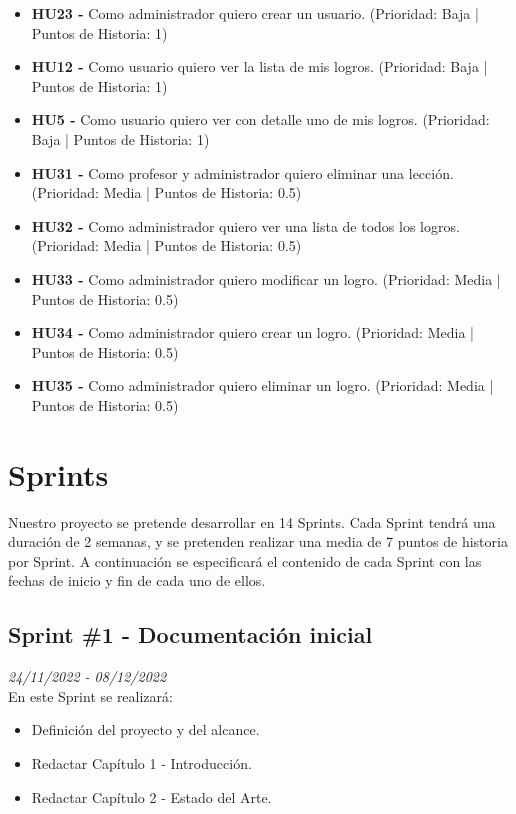 \begin{itemize}
    \item \textbf{HU23 - } Como administrador quiero crear un usuario. (Prioridad: Baja | Puntos de Historia: 1)
    \item \textbf{HU12 - } Como usuario quiero ver la lista de mis logros. (Prioridad: Baja | Puntos de Historia: 1)
    \item \textbf{HU5 - } Como usuario quiero ver con detalle uno de mis logros.  (Prioridad: Baja | Puntos de Historia: 1)
    \item \textbf{HU31 - } Como profesor y administrador quiero eliminar una lección. (Prioridad: Media | Puntos de Historia: 0.5)
    \item \textbf{HU32 - } Como administrador quiero ver una lista de todos los logros. (Prioridad: Media | Puntos de Historia: 0.5)
    \item \textbf{HU33 - } Como administrador quiero modificar un logro. (Prioridad: Media | Puntos de Historia: 0.5)
    \item \textbf{HU34 - } Como administrador quiero crear un logro. (Prioridad: Media | Puntos de Historia: 0.5)
    \item \textbf{HU35 - } Como administrador quiero eliminar un logro. (Prioridad: Media | Puntos de Historia: 0.5)
\end{itemize}

\section{Sprints}
Nuestro proyecto se pretende desarrollar en 14 Sprints. Cada Sprint tendrá una duración de 2 semanas, y se pretenden realizar una media
de 7 puntos de historia por Sprint. A continuación se especificará el contenido de cada Sprint con las fechas de inicio y fin de cada uno de ellos.

\subsection{Sprint \#1 - Documentación inicial}
\textit{24/11/2022   -   08/12/2022}\\

En este Sprint se realizará:
\begin{itemize}

    \item Definición del proyecto y del alcance.
    \item Redactar Capítulo 1 - Introducción.
    \item Redactar Capítulo 2 - Estado del Arte.
\end{itemize}
